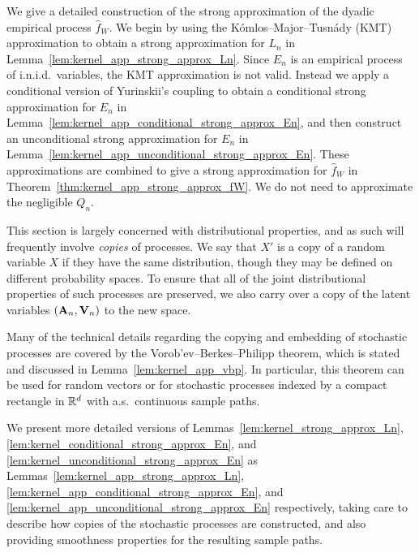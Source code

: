 We give a detailed construction of the
strong approximation of the dyadic empirical process $\hat f_W$.
We begin by using the
K{\'o}mlos--Major--Tusn{\'a}dy (KMT) approximation
to obtain a strong approximation for $L_n$
in Lemma~\ref{lem:kernel_app_strong_approx_Ln}.
Since $E_n$ is an empirical process of i.n.i.d.\ variables,
the KMT approximation is not valid.
Instead we apply a conditional version of
Yurinskii's coupling to obtain a
conditional strong approximation for $E_n$
in Lemma~\ref{lem:kernel_app_conditional_strong_approx_En},
and then construct an unconditional
strong approximation for $E_n$
in Lemma~\ref{lem:kernel_app_unconditional_strong_approx_En}.
These approximations are combined to give a
strong approximation for $\hat f_W$
in Theorem~\ref{thm:kernel_app_strong_approx_fW}.
We do not need to approximate
the negligible $Q_n$.

This section is largely concerned with
distributional properties,
and as such will frequently involve
\emph{copies} of processes.
We say that $X'$ is a copy of a random variable $X$
if they have the same distribution,
though they may be defined on different probability spaces.
To ensure that all of the joint distributional properties of
such processes are preserved,
we also carry over a copy of the latent variables
$(\mathbf{A}_n, \mathbf{V}_n)$
to the new space.

Many of the technical details regarding
the copying and embedding of stochastic processes
are covered by the
Vorob'ev--Berkes--Philipp theorem,
which is stated and discussed in
Lemma~\ref{lem:kernel_app_vbp}.
In particular, this theorem can be used
for random vectors or for stochastic processes
indexed by a compact rectangle in $\mathbb{R}^d$
with a.s.\ continuous sample paths.

We present more detailed versions of
Lemmas~\ref{lem:kernel_strong_approx_Ln},
\ref{lem:kernel_conditional_strong_approx_En},
and \ref{lem:kernel_unconditional_strong_approx_En}
as Lemmas~\ref{lem:kernel_app_strong_approx_Ln},
\ref{lem:kernel_app_conditional_strong_approx_En},
and \ref{lem:kernel_app_unconditional_strong_approx_En}
respectively, taking care to describe how copies of
the stochastic processes are constructed,
and also providing smoothness properties for
the resulting sample paths.

